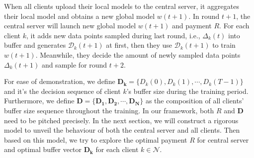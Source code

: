 \documentclass{article}
\theoremstyle{plain}
\theoremstyle{definition}
\theoremstyle{remark}
\begin{document}
When all clients upload their local models to the central server, it aggregates their local model and obtains a new global model $w(t+1)$.
In round $t + 1$, the central server will launch new global model $w(t+1)$ and payment $R$. For each client $k$, it adds new data points sampled during last round, i.e., $\Delta_k(t)$ into buffer and generates $\mathcal{D}_k(t+1)$ at first, then they use $\mathcal{D}_k(t+1)$ to train $w(t+1)$. 
Meanwhile, they decide the amount of newly sampled data points $\Delta_k(t+1)$ and sample for round $t+2$. 

For ease of demonstration, we define $\boldsymbol{D_k} = \{D_k(0), D_k(1), \cdots, D_k(T-1)\}$ and it's the decision sequence of client $k$'s buffer size during the training period.
Furthermore, we define $\boldsymbol{D} = \{\boldsymbol{D_1}, \boldsymbol{D_2}, \cdots, \boldsymbol{D_N}\}$ as the composition of all clients' buffer size sequence throughout the training.
In our framework, both $R$ and $\boldsymbol{D}$ need to be pitched precisely.
In the next section, we will construct a rigorous model to unveil the behaviour of both the central server and all clients.
Then based on this model, we try to explore the optimal payment $R$ for central server and optimal buffer vector $\boldsymbol{D_k}$ for each client $k \in \mathcal{N}$.
\end{document}
